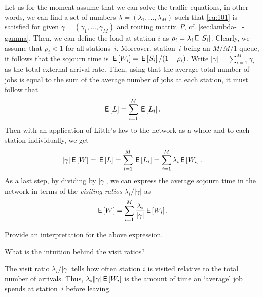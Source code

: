 Let us for the moment assume that we can solve the traffic equations, in other words, we can find a set of numbers $\lambda =(\lambda_1, \ldots, \lambda_M)$ such that \cref{eq:101} is satisfied for given $\gamma =(\gamma_1, \ldots, \gamma_M)$ and routing matrix~$P$, cf.
\cref{sec:lambda-=-gamma}.
Then, we can define the load at station $i$ as $\rho_i = \lambda_i \,\mathsf{E}\left[S_i\right]$.
Clearly, we assume that $\rho_i < 1$ for all stations~$i$.
Moreover, station~$i$ being an $M/M/1$ queue, it follows that the sojourn time is $\,\mathsf{E}\left[W_i\right] = \,\mathsf{E}\left[S_i\right]/(1-\rho_i)$.
Write $|\gamma|= \sum_{i=1}^M \gamma_i$ as the total external arrival rate.
Then, using that the average total number of jobs is equal to the sum of the average number of jobs at each station, it must follow that
\begin{equation*}
 \,\mathsf{E}\left[L\right] = \sum_{i=1}^M \,\mathsf{E}\left[L_i\right].
\end{equation*}
Then with an application of Little's law to the network as a whole and to each station individually, we get
\begin{equation*}
  |\gamma| \,\mathsf{E}\left[W\right] = \,\mathsf{E}\left[L\right] = \sum_{i=1}^M \,\mathsf{E}\left[L_i\right] = \sum_{i=1}^M \lambda_i \,\mathsf{E}\left[W_i\right]. 
\end{equation*}
As a last step, by dividing by $|\gamma|$, we can express the average sojourn time in the network in terms of the \emph{visiting ratios} $\lambda_i/|\gamma|$ as
\begin{equation*}
 \,\mathsf{E}\left[W\right] = \sum_{i=1}^M \frac{\lambda_i}{|\gamma|} \,\mathsf{E}\left[W_i\right]. 
\end{equation*}

\begin{exercise}
  Provide an interpretation for the above expression.
\begin{hint}
    What  is the intuition behind the visit ratios?
\end{hint}
\begin{solution}
  The visit ratio $\lambda_i/|\gamma|$ tells how often station $i$ is visited relative to the total number of arrivals.
  Thus, $\lambda_i\|\gamma| \,\mathsf{E}\left[W_i\right]$ is the amount of time an `average' job spends at station~$i$ before leaving.
\end{solution}
\end{exercise}

